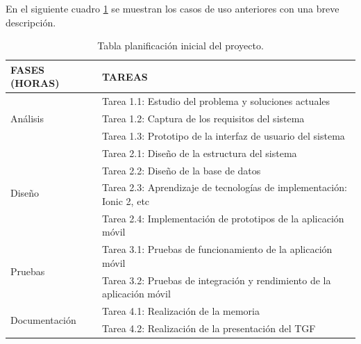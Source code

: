 \medskip
En el siguiente cuadro \ref{planificacion-inicial} se muestran los casos de uso anteriores con una breve descripción.
\begin{table}
    \begin{tabular}{|lp{12cm}|}
        \hline
        FASES (HORAS) & TAREAS \\ \hline

        \multirow{3}{*}{Análisis}
        \multirow{3}{*}{(70)}
        & Tarea 1.1: Estudio del problema y soluciones actuales \\
        & Tarea 1.2: Captura de los requisitos del sistema \\
        & Tarea 1.3: Prototipo de la interfaz de usuario del sistema \\ \hline

        \multirow{4}{*}{Diseño}
        \multirow{4}{*}{(160)}
        & Tarea 2.1: Diseño de la estructura del sistema \\
        & Tarea 2.2: Diseño de la base de datos \\
        & Tarea 2.3: Aprendizaje de tecnologías de implementación: Ionic 2, etc \\
        & Tarea 2.4: Implementación de prototipos de la aplicación móvil \\ \hline

        \multirow{2}{*}{Pruebas}
        \multirow{2}{*}{(30)}
        & Tarea 3.1: Pruebas de funcionamiento de la aplicación móvil \\
        & Tarea 3.2: Pruebas de integración y rendimiento de la aplicación móvil \\ \hline

        \multirow{2}{*}{Documentación}
        \multirow{2}{*}{(40)}
        & Tarea 4.1: Realización de la memoria \\
        & Tarea 4.2: Realización de la presentación del TGF \\ \hline
    \end{tabular}

    \caption{Tabla planificación inicial del proyecto.}\label{planificacion-inicial}
\end{table}